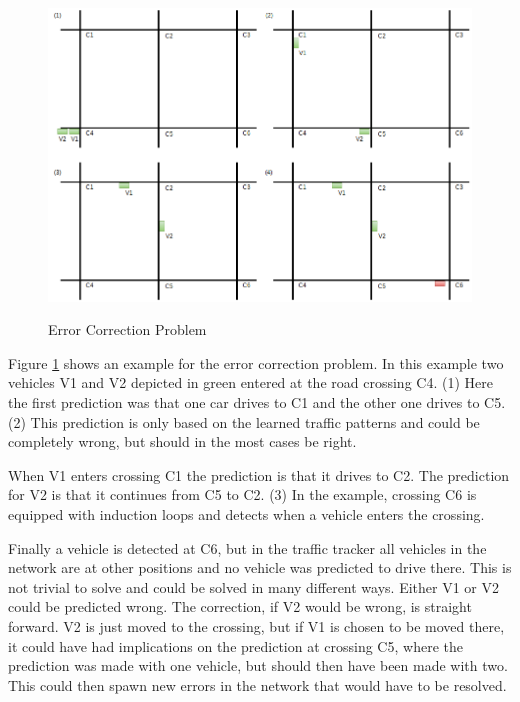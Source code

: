 \begin{figure}[ht]
  \centering
  \includegraphics[width=16cm]{figures/errorCorrectionProblem}
  \label{errorCorrectionProblem}
  \caption[Error Correction Problem]{Error Correction Problem \protect\footnotemark}
\end{figure}


Figure \ref{errorCorrectionProblem} shows an example for the error correction problem. In this example two vehicles V1 and V2 depicted in green entered at the road crossing C4. (1) Here the first prediction was that one car drives to C1 and the other one drives to C5. (2) This prediction is only based on the learned traffic patterns and could be completely wrong, but should in the most cases be right.

When V1 enters crossing C1 the prediction is that it drives to C2. The prediction for V2 is that it continues from C5 to C2. (3) In the example, crossing C6 is equipped with induction loops and detects when a vehicle enters the crossing.

Finally a vehicle is detected at C6, but in the traffic tracker all vehicles in the network are at other positions and no vehicle was predicted to drive there. This is not trivial to solve and could be solved in many different ways. Either V1 or V2 could be predicted wrong. The correction, if V2 would be wrong, is straight forward. V2 is just moved to the crossing, but if V1 is chosen to be moved there, it could have had implications on the prediction at crossing C5, where the prediction was made with one vehicle, but should then have been made with two. This could then spawn new errors in the network that would have to be resolved.

